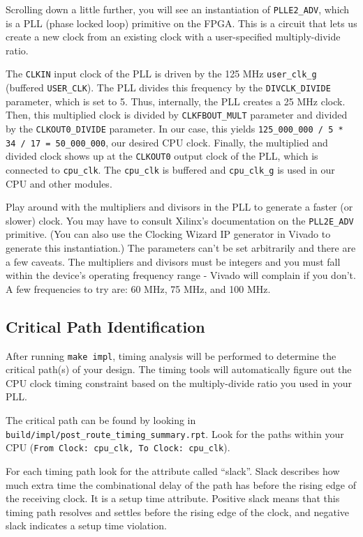 \documentclass[11pt]{article}
\begin{document}
Scrolling down a little further, you will see an instantiation of \verb|PLLE2_ADV|, which is a PLL (phase locked loop) primitive on the FPGA.
This is a circuit that lets us create a new clock from an existing clock with a user-specified multiply-divide ratio.

The \verb|CLKIN| input clock of the PLL is driven by the 125 MHz \verb|user_clk_g| (buffered \verb|USER_CLK|). The PLL divides this frequency by the \verb|DIVCLK_DIVIDE| parameter, which is set to 5. Thus, internally, the PLL creates a 25 MHz clock. Then, this multiplied clock is divided by \verb|CLKFBOUT_MULT| parameter and divided by the \verb|CLKOUT0_DIVIDE| parameter. In our case, this yields \verb|125_000_000 / 5 * | \newline \verb|34 / 17 = 50_000_000|, our desired CPU clock. Finally, the multiplied and divided clock shows up at the \verb|CLKOUT0| output clock of the PLL, which is connected to \verb|cpu_clk|. The \verb|cpu_clk| is buffered and \verb|cpu_clk_g| is used in our CPU and other modules.

Play around with the multipliers and divisors in the PLL to generate a faster (or slower) clock. You may have to consult Xilinx's documentation on the \verb|PLL2E_ADV| primitive. (You can also use the Clocking Wizard IP generator in Vivado to generate this instantiation.) The parameters can't be set arbitrarily and there are a few caveats. The multipliers and divisors must be integers and you must fall within the device's operating frequency range - Vivado will complain if you don't. A few frequencies to try are: 60 MHz, 75 MHz, and 100 MHz.

\subsection{Critical Path Identification}
After running \verb|make impl|, timing analysis will be performed to determine the critical path(s) of your design.
The timing tools will automatically figure out the CPU clock timing constraint based on the multiply-divide ratio you used in your PLL.

The critical path can be found by looking in \verb|build/impl/post_route_timing_summary.rpt|.
Look for the paths within your CPU (\verb|From Clock: cpu_clk, To Clock: cpu_clk|).

For each timing path look for the attribute called ``slack''. Slack describes how much extra time the combinational delay of the path has before the rising edge of the receiving clock. It is a setup time attribute. Positive slack means that this timing path resolves and settles before the rising edge of the clock, and negative slack indicates a setup time violation.
\end{document}
